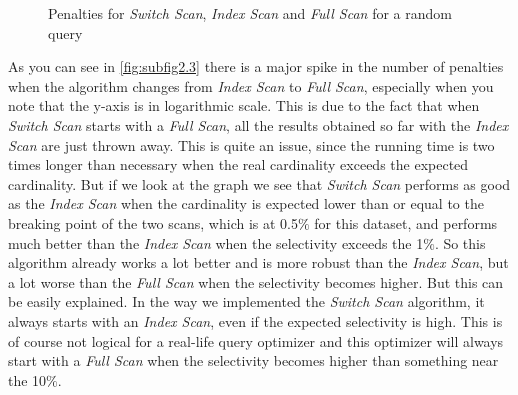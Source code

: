 \documentclass[a4paper,11pt,twoside]{article}
\begin{document}
\begin{figure}[ht!]
\quad
{}
%		
\caption{Penalties for \textit{Switch Scan}, \textit{Index Scan} and \textit{Full Scan} for a random query}
\label{fig:result2}
\end{figure}
\pagebreak
As you can see in \autoref{fig:subfig2.3} there is a major spike in the number of penalties when the algorithm changes from \textit{Index Scan} to \textit{Full Scan}, especially when you note that the y-axis is in logarithmic scale. This is due to the fact that when \textit{Switch Scan} starts with a \textit{Full Scan}, all the results obtained so far with the \textit{Index Scan} are just thrown away. This is quite an issue, since the running time is two times longer than necessary when the real cardinality exceeds the expected cardinality. But if we look at the graph we see that \textit{Switch Scan} performs as good as the \textit{Index Scan} when the cardinality is expected lower than or equal to the breaking point of the two scans, which is at 0.5$\%$ for this dataset, and performs much better than the \textit{Index Scan} when the selectivity exceeds the 1$\%$. So this algorithm already works a lot better and is more robust than the \textit{Index Scan}, but a lot worse than the \textit{Full Scan} when the selectivity becomes higher. But this can be easily explained. In the way we implemented the \textit{Switch Scan} algorithm, it always starts with an \textit{Index Scan}, even if the expected selectivity is high. This is of course not logical for a real-life query optimizer and this optimizer will always start with a \textit{Full Scan} when the selectivity becomes higher than something near the 10$\%$.
\end{document}
